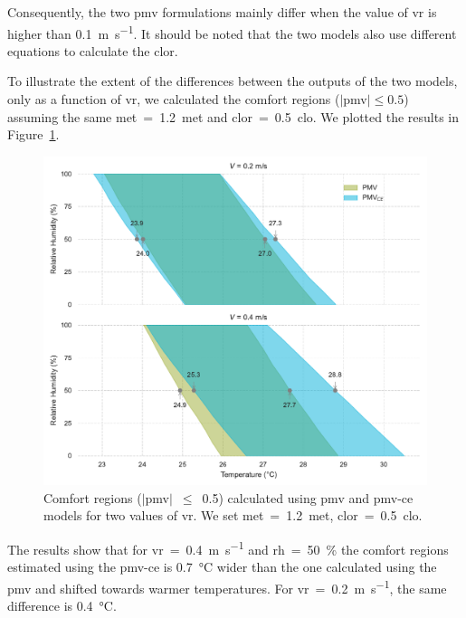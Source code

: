 Consequently, the two \ac{pmv} formulations mainly differ when the value of \ac{vr} is higher than \qty{0.1}{\m\per\s}.
It should be noted that the two models also use different equations to calculate the \ac{clor}.

To illustrate the extent of the differences between the outputs of the two models, only as a function of \ac{vr}, we calculated the comfort regions ($\mid$\ac{pmv}$\mid \leq 0.5$) assuming the same \ac{met}~=~\qty{1.2}{met} and \ac{clor}~=~\qty{0.5}{clo}.
We plotted the results in Figure~\ref{fig:comfort_regios_pmv_pmvce}.
\begin{figure}[!htb]
    \centering
    \includegraphics[width=1\textwidth]{figures/pmv_comfort_regions}
    \caption{Comfort regions ($|$\ac{pmv}$|$~$\leq$~\num{0.5}) calculated using \ac{pmv} and \ac{pmv-ce} models for two values of \ac{vr}.
    We set \ac{met}~=~\qty{1.2}{met}, \ac{clor}~=~\qty{0.5}{clo}.
    \label{fig:comfort_regios_pmv_pmvce}}
\end{figure}
The results show that for \ac{vr}~=~\qty{0.4}{\m\per\s} and \ac{rh}~=~\qty{50}{\percent} the comfort regions estimated using the \ac{pmv-ce} is \qty{0.7}{\celsius} wider than the one calculated using the \ac{pmv} and shifted towards warmer temperatures.
For \ac{vr}~=~\qty{0.2}{\m\per\s}, the same difference is \qty{0.4}{\celsius}.

